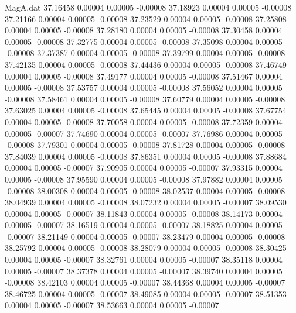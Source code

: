 \begin{filecontents}{MagA.dat}
  37.16458    0.00004    0.00005   -0.00008
  37.18923    0.00004    0.00005   -0.00008
  37.21166    0.00004    0.00005   -0.00008
  37.23529    0.00004    0.00005   -0.00008
  37.25808    0.00004    0.00005   -0.00008
  37.28180    0.00004    0.00005   -0.00008
  37.30458    0.00004    0.00005   -0.00008
  37.32775    0.00004    0.00005   -0.00008
  37.35098    0.00004    0.00005   -0.00008
  37.37387    0.00004    0.00005   -0.00008
  37.39799    0.00004    0.00005   -0.00008
  37.42135    0.00004    0.00005   -0.00008
  37.44436    0.00004    0.00005   -0.00008
  37.46749    0.00004    0.00005   -0.00008
  37.49177    0.00004    0.00005   -0.00008
  37.51467    0.00004    0.00005   -0.00008
  37.53757    0.00004    0.00005   -0.00008
  37.56052    0.00004    0.00005   -0.00008
  37.58461    0.00004    0.00005   -0.00008
  37.60779    0.00004    0.00005   -0.00008
  37.63025    0.00004    0.00005   -0.00008
  37.65445    0.00004    0.00005   -0.00008
  37.67754    0.00004    0.00005   -0.00008
  37.70058    0.00004    0.00005   -0.00008
  37.72359    0.00004    0.00005   -0.00007
  37.74690    0.00004    0.00005   -0.00007
  37.76986    0.00004    0.00005   -0.00008
  37.79301    0.00004    0.00005   -0.00008
  37.81728    0.00004    0.00005   -0.00008
  37.84039    0.00004    0.00005   -0.00008
  37.86351    0.00004    0.00005   -0.00008
  37.88684    0.00004    0.00005   -0.00007
  37.90905    0.00004    0.00005   -0.00007
  37.93315    0.00004    0.00005   -0.00008
  37.95590    0.00004    0.00005   -0.00008
  37.97882    0.00004    0.00005   -0.00008
  38.00308    0.00004    0.00005   -0.00008
  38.02537    0.00004    0.00005   -0.00008
  38.04939    0.00004    0.00005   -0.00008
  38.07232    0.00004    0.00005   -0.00007
  38.09530    0.00004    0.00005   -0.00007
  38.11843    0.00004    0.00005   -0.00008
  38.14173    0.00004    0.00005   -0.00007
  38.16519    0.00004    0.00005   -0.00007
  38.18825    0.00004    0.00005   -0.00007
  38.21149    0.00004    0.00005   -0.00007
  38.23479    0.00004    0.00005   -0.00008
  38.25792    0.00004    0.00005   -0.00008
  38.28079    0.00004    0.00005   -0.00008
  38.30425    0.00004    0.00005   -0.00007
  38.32761    0.00004    0.00005   -0.00007
  38.35118    0.00004    0.00005   -0.00007
  38.37378    0.00004    0.00005   -0.00007
  38.39740    0.00004    0.00005   -0.00008
  38.42103    0.00004    0.00005   -0.00007
  38.44368    0.00004    0.00005   -0.00007
  38.46725    0.00004    0.00005   -0.00007
  38.49085    0.00004    0.00005   -0.00007
  38.51353    0.00004    0.00005   -0.00007
  38.53663    0.00004    0.00005   -0.00007

\end{filecontents}

